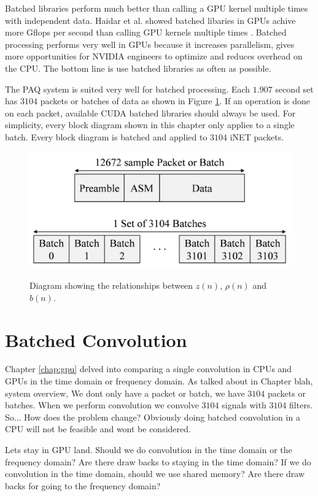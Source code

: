 Batched libraries perform much better than calling a GPU kernel multiple times with independent data.
Haidar et al. showed batched libaries in GPUs achive more Gflops per second than calling GPU kernels multiple times \cite{haidar2015optimization}.
Batched processing performs very well in GPUs because it increases parallelism, gives more opportunities for NVIDIA engineers to optimize and reduces overhead on the CPU.
The bottom line is use batched libraries as often as possible.

The PAQ system is suited very well for batched processing.
Each $1.907$ second set has $3104$ packets or batches of data as shown in Figure \ref{fig:packet_batch_set}.
If an operation is done on each packet, available CUDA batched libraries should always be used.
For simplicity, every block diagram shown in this chapter only applies to a single batch.
Every block diagram is batched and applied to $3104$ iNET packets.
\begin{figure}
	\caption{Diagram showing the relationships between $z(n)$, $\rho(n)$ and $b(n)$.}
	\centering\includegraphics[width=5.94in/100*55]{figures/eq_GPUimplementation/packet_batch_set.pdf}
	\label{fig:packet_batch_set}
\end{figure}


\section{Batched Convolution}
Chapter \ref{chap:gpu} delved into comparing a single convolution in CPUs and GPUs in the time domain or frequency domain.
As talked about in Chapter blah, system overview, We dont only have a packet or batch, we have $3104$ packets or batches.
When we perform convolution we convolve $3104$ signals with $3104$ filters.
So...
How does the problem change?
Obviously doing batched convolution in a CPU will not be feasible and wont be considered.

Lets stay in GPU land.
Should we do convolution in the time domain or the frequency domain?
Are there draw backs to staying in the time domain? 
If we do convolution in the time domain, should we use shared memory?
Are there draw backs for going to the frequency domain? 

